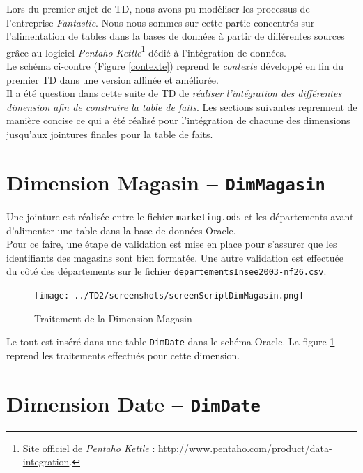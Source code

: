 Lors du premier sujet de TD, nous avons pu modéliser les processus de l'entreprise \textit{Fantastic}. Nous nous sommes sur cette partie concentrés sur l'alimentation de tables dans la bases de données à partir de différentes sources grâce au logiciel \textit{Pentaho Kettle}\footnote{Site officiel de \textit{Pentaho Kettle} : \url{http://www.pentaho.com/product/data-integration}.} dédié à l'intégration de données.\\

Le schéma ci-contre (Figure \ref{contexte}) reprend le \textit{contexte} développé en fin du premier TD dans une version affinée et améliorée.\\

Il a été question dans cette suite de TD de \textit{réaliser l'intégration des différentes dimension afin de construire la table de faits}. Les sections suivantes reprennent de manière concise ce qui a été réalisé  pour l'intégration de chacune des dimensions jusqu'aux jointures finales pour la table de faits.
  	

\section{Dimension Magasin -- \texttt{DimMagasin}}

Une jointure est réalisée entre le fichier \texttt{marketing.ods} et les départements avant d'alimenter une table dans la base de données Oracle.\\

Pour ce faire, une étape de validation est mise en place pour s'assurer que les identifiants des magasins sont bien formatée. Une autre validation est effectuée du côté des départements sur le fichier \texttt{departementsInsee2003-nf26.csv}.

	\begin{figure}[H]
      \centerline{\texttt{[image: ../TD2/screenshots/screenScriptDimMagasin.png]}}
      \caption{Traitement de la Dimension Magasin}
      \label{magasin}
  	\end{figure}
  	
  	Le tout est inséré dans une table \texttt{DimDate} dans le schéma Oracle. La figure \ref{magasin} reprend les traitements effectués pour cette dimension.

\section{Dimension Date -- \texttt{DimDate}}

